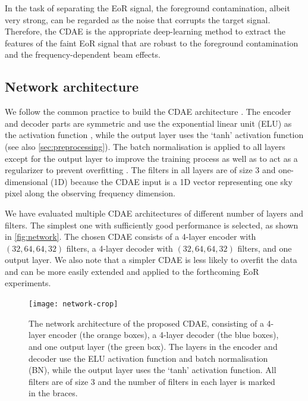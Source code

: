 \documentclass[letters,a4paper,fleqn,usenatbib]{mnras}
\begin{document}
In the task of separating the EoR signal, the foreground contamination,
albeit very strong, can be regarded as the noise that corrupts the
target signal.
Therefore, the CDAE is the appropriate deep-learning method to extract
the features of the faint EoR signal that are robust to the foreground
contamination and the frequency-dependent beam effects.


\subsection{Network architecture}
\label{sec:architecture}

We follow the common practice to build the CDAE architecture
\citep[e.g.,][]{suganuma2018,geron2017}.
The encoder and decoder parts are symmetric and use the exponential
linear unit (ELU) as the activation function \citep{clevert2016},
while the output layer uses the `tanh' activation function (see also
\autoref{sec:preprocessing}).
The batch normalisation is applied to all layers except for the output
layer to improve the training process as well as to act as a regularizer
to prevent overfitting \citep{ioffe2015}.
The filters in all layers are of size 3 and one-dimensional (1D) because
the CDAE input is a 1D vector representing one sky pixel along the
observing frequency dimension.

We have evaluated multiple CDAE architectures of different number of
layers and filters.
The simplest one with sufficiently good performance is selected, as
shown in \autoref{fig:network}.
The chosen CDAE consists of a 4-layer encoder with $(32,64,64,32)$
filters, a 4-layer decoder with $(32,64,64,32)$ filters, and one output
layer.
We also note that a simpler CDAE is less likely to overfit the data
and can be more easily extended and applied to the forthcoming EoR
experiments.

\begin{figure}
  \centering
  \texttt{[image: network-crop]}
  \caption{\label{fig:network}%
    The network architecture of the proposed CDAE, consisting of a
    4-layer encoder (the orange boxes), a 4-layer decoder (the blue
    boxes), and one output layer (the green box).
    The layers in the encoder and decoder use the ELU activation
    function and batch normalisation (BN), while the output layer uses
    the `tanh' activation function.
    All filters are of size 3 and the number of filters in each layer
    is marked in the braces.
  }
\end{figure}
\end{document}
